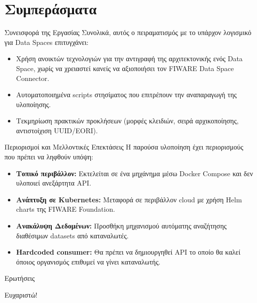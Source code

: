 \documentclass[11pt]{beamer}
\newcommand{\en}[1]{\foreignlanguage{english}{#1}}
\begin{document}
\section{Συμπεράσματα}

\begin{frame}{Συνεισφορά της Εργασίας}
Συνολικά, αυτός ο πειραματισμός με το υπάρχον λογισμικό για \en{Data Spaces} επιτυγχάνει:
\bigskip
\begin{itemize}
    \item Χρήση ανοικτών τεχνολογιών για την αντιγραφή της αρχιτεκτονικής ενός
    \en{Data Space}, χωρίς να χρειαστεί κανείς να αξιοποιήσει τον \en{FIWARE Data Space Connector}.
    \bigskip

    \item Αυτοματοποιημένα \en{scripts} στησίματος που επιτρέπουν
    την αναπαραγωγή της υλοποίησης.
    \bigskip

    \item Τεκμηρίωση πρακτικών προκλήσεων (μορφές κλειδιών, σειρά
    αρχικοποίησης, αντιστοίχιση \en{UUID}/\en{EORI}).
    \bigskip

\end{itemize}
\end{frame}

\begin{frame}{Περιορισμοί και Μελλοντικές Επεκτάσεις}
Η παρούσα υλοποίηση έχει περιορισμούς που πρέπει να ληφθούν υπόψη:
\smallskip
\begin{itemize}
    \item \textbf{Τοπικό περιβάλλον:} Εκτελείται σε ένα μηχάνημα
    μέσω \en{Docker Compose} και δεν υλοποιεί ανεξάρτητα \en{API}.
    \bigskip

    \item \textbf{Ανάπτυξη σε \en{Kubernetes}:} Μεταφορά σε
    περιβάλλον \en{cloud} με χρήση \en{Helm charts} της
    \en{FIWARE Foundation}.
    \bigskip

    \item \textbf{Ανακάλυψη Δεδομένων:} Προσθήκη μηχανισμού
    αυτόματης αναζήτησης διαθέσιμων \en{datasets} από
    καταναλωτές.
    \bigskip

    \item \textbf{\textlatin{Hardcoded consumer:}} Θα πρέπει να δημιουργηθεί \en{API}
    το οποίο θα καλεί όποιος οργανισμός επιθυμεί να γίνει καταναλωτής.
    \bigskip
\end{itemize}
\end{frame}

\begin{frame}{Ερωτήσεις}
\begin{center}
\vspace{2cm}
\Huge \textcolor{NTUABlue}{Ευχαριστώ!}
\bigskip\bigskip\bigskip

\end{center}
\end{frame}
\end{document}
